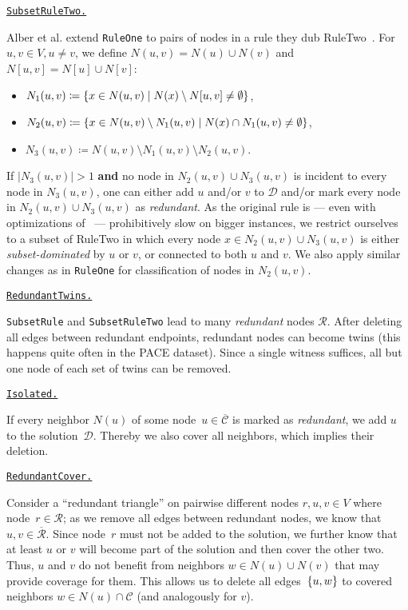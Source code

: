 \documentclass[a4paper, USenglish, cleveref, autoref, thm-restate, noalgorithm2e]{socg-lipics-v2021}
\newcommand{\setc}[2]{\ensuremath\left\{#1\;\middle|\;#2\right\}}
\newcommand{\set}[1]{\ensuremath\left\{#1\right\}}
\newcommand{\domset}{\ensuremath{\mathcal D}\xspace}
\newcommand{\cov}{\ensuremath{\mathcal C}\xspace}
\newcommand{\red}{\ensuremath{\mathcal R}\xspace}
\newcommand{\ccov}{\ensuremath{\overline{\mathcal C}}\xspace}
\newcommand{\cred}{\ensuremath{\overline{\mathcal R}}\xspace}
\def\defrule#1{%
    \medskip
    
    \noindent
    \underline{\texttt{#1.}}
}
\begin{document}
\defrule{SubsetRuleTwo}
Alber et al. extend \texttt{RuleOne} to pairs of nodes in a rule they dub RuleTwo~\cite{DBLP:journals/jacm/AlberFN04}.
For $u, v \in V, u \neq v$, we define $N(u, v) = N(u) \cup N(v)$ and $N[u, v] = N[u] \cup N[v]$:
\begin{itemize}
    \item $N_1(u, v) \coloneqq \setc{x \in N(u, v)}{N(x) \setminus N[u, v] \neq \emptyset}$,
    \item $N_2(u, v) \coloneqq \setc{x \in N(u, v) \setminus N_1(u, v)}{N(x) \cap N_1(u, v) \neq \emptyset}$,
    \item $N_3(u, v) \coloneqq N(u, v) \setminus N_1(u, v) \setminus N_2(u, v)$.
\end{itemize}
If $|N_3(u, v)| > 1$ \textbf{and} no node in $N_2(u, v) \cup N_3(u, v)$ is incident to every node in $N_3(u, v)$, one can either add $u$ and/or $v$ to $\domset$ and/or mark every node in $N_2(u, v) \cup N_3(u, v)$ as \emph{redundant}.
As the original rule is --- even with optimizations of~\cite{SBFS} --- prohibitively slow on bigger instances, we restrict ourselves to a subset of RuleTwo in which every node $x \in N_2(u, v) \cup N_3(u, v)$ is either \emph{subset-dominated} by $u$ or $v$, or connected to both $u$ and $v$.
We also apply similar changes as in \texttt{RuleOne} for classification of nodes in $N_2(u, v)$.

\defrule{RedundantTwins}
\texttt{SubsetRule} and \texttt{SubsetRuleTwo} lead to many \emph{redundant} nodes \red.
After deleting all edges between redundant endpoints, redundant nodes can become twins (this happens quite often in the PACE dataset).
Since a single witness suffices, all but one node of each set of twins can be removed.

\defrule{Isolated}
If every neighbor $N(u)$ of some node~$u \in \ccov$ is marked as \emph{redundant}, we add $u$ to the solution~$\domset$.
Thereby we also cover all neighbors, which implies their deletion.

\defrule{RedundantCover}
Consider a ``redundant triangle'' on pairwise different nodes $r, u, v \in V$ where node~$r \in \red$;
as we remove all edges between redundant nodes, we know that $u, v \in \cred$.
Since node~$r$ must not be added to the solution, we further know that at least $u$ or $v$ will become part of the solution and then cover the other two.
Thus, $u$ and $v$ do not benefit from neighbors $w \in N(u) \cup N(v)$ that may provide coverage for them.
This allows us to delete all edges~$\set{u, w}$ to covered neighbors $w \in N(u) \cap \cov$ (and analogously for $v$).
\end{document}
